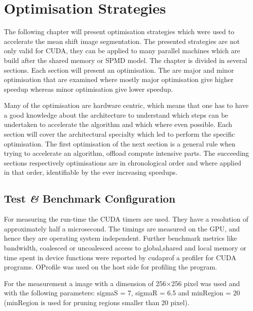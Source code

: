 

\chapter{Optimisation Strategies}
\label{ch:optimization}


The following chapter will present optimisation strategies which were used to
accelerate the mean shift image segmentation. The presented strategies are not
only valid for \gls{CUDA}, they can be applied to many parallel machines which
are build after the shared memory or \gls{SPMD} model. The chapter is divided in
several sections. Each section will present an optimisation. The are major and
minor optimisation that are examined where mostly major optimisation give higher
speedup whereas minor optimisation give lower speedup. 

Many of the optimisation are hardware centric, which means that one has to have
a good knowledge about the architecture to understand which steps can be
undertaken to accelerate the algorithm and which where even possible. Each
section will cover the architectural specialty which led to perform the specific
optimisation. The first optimisation of the next section is a general rule when
trying to accelerate an algorithm, offload compute intensive parts. The succeeding
sections respectively optimisations are in chronological order and where applied
in that order, identifiable by the ever increasing speedups. 


\section{Test \textit{\&} Benchmark Configuration} %
\label{sec:test__benchmark_configuration}
For measuring the run-time the \gls{CUDA} timers are used. They have a
resolution of approximately half a microsecond. The timings are measured on the
\gls{GPU}, and hence they are operating system independent. Further benchmark
metrics like bandwidth, coalesced or uncoalesced access to global,shared and
local memory or time spent in device functions were reported by cudaprof a
profiler for \gls{CUDA} programs. OProfile was used on the host side for
profiling the program.

For the measurement a image with a dimension of 256$\times$256 pixel was used
and with the following parameters: \textsf{sigmaS} = 7, \textsf{sigmaR} = 6.5
and \textsf{minRegion} = 20 (\textsf{minRegion} is used for pruning regions
smaller than 20 pixel).


